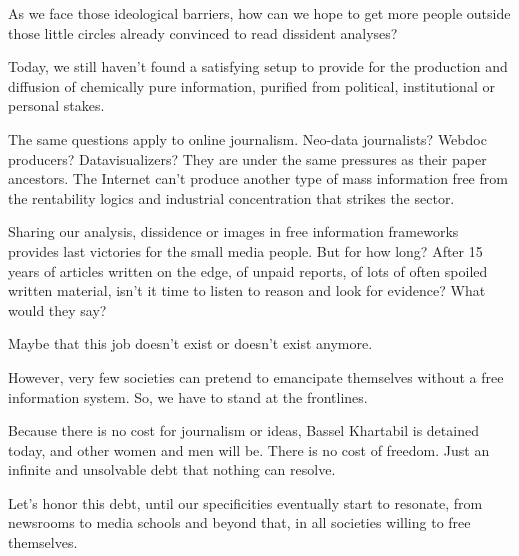 As we face those ideological barriers, how can we hope to get more
people outside those little circles already convinced to read dissident
analyses?

Today, we still haven't found a satisfying setup to provide for the
production and diffusion of chemically pure information, purified from
political, institutional or personal stakes.

The same questions apply to online journalism. Neo-data journalists?
Webdoc producers? Datavisualizers? They are under the same pressures as
their paper ancestors. The Internet can't produce another type of mass
information free from the rentability logics and industrial
concentration that strikes the sector.

Sharing our analysis, dissidence or images in free information
frameworks provides last victories for the small media people. But for
how long? After 15 years of articles written on the edge, of unpaid
reports, of lots of often spoiled written material, isn't it time to
listen to reason and look for evidence? What would they say?

Maybe that this job doesn't exist or doesn't exist anymore.

However, very few societies can pretend to emancipate themselves without
a free information system. So, we have to stand at the frontlines.

Because there is no cost for journalism or ideas, Bassel Khartabil is
detained today, and other women and men will be. There is no cost of
freedom. Just an infinite and unsolvable debt that nothing can resolve.

Let's honor this debt, until our specificities eventually start to
resonate, from newsrooms to media schools and beyond that, in all
societies willing to free themselves.
